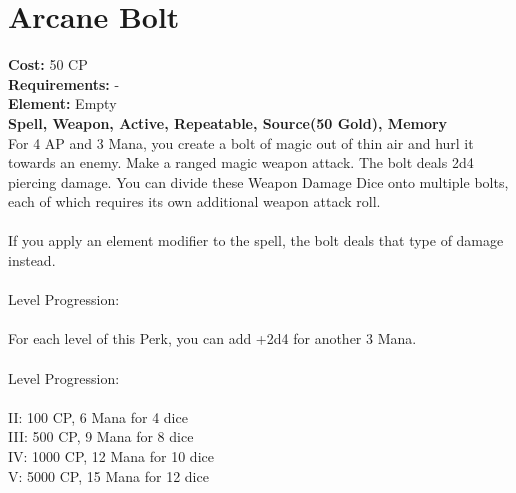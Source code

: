 \section{Arcane Bolt}
\textbf{Cost:} 50 CP\\
\textbf{Requirements:} -\\
\textbf{Element:} Empty\\
\textbf{Spell, Weapon, Active, Repeatable, Source(50 Gold), Memory}\\
For 4 AP and 3 Mana, you create a bolt of magic out of thin air and hurl it towards an enemy. Make a ranged magic weapon attack. The bolt deals 2d4 piercing damage. You can divide these Weapon Damage Dice onto multiple bolts, each of which requires its own additional weapon attack roll.\\
\\
If you apply an element modifier to the spell, the bolt deals that type of damage instead.\\
\\
Level Progression:\\
\\
For each level of this Perk, you can add +2d4 for another 3 Mana. \\
\\
Level Progression:\\
\\
II: 100 CP, 6 Mana for 4 dice\\
III: 500 CP, 9 Mana for 8 dice\\
IV: 1000 CP, 12 Mana for 10 dice\\
V: 5000 CP, 15 Mana for 12 dice\\